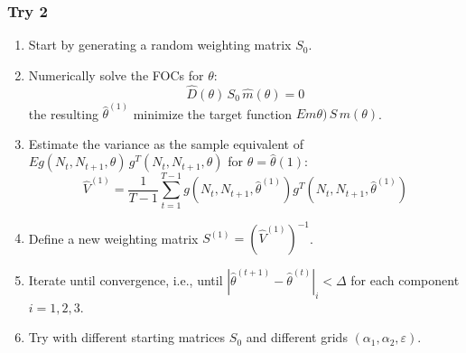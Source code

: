     \subsubsection{Try 2}
    \begin{enumerate}
        \item Start by generating a random weighting matrix $S_0$.
        \item Numerically solve the FOCs for $\theta$:
        \begin{equation}
            \hat D(\theta) \, S_0 \, \hat m (\theta) = 0
        \end{equation}
         the resulting $\hat \theta^{(1)}$ minimize the target function $E m\theta)  \, S \, m(\theta)$.
        \item Estimate the variance as the sample equivalent of $E g(N_t, N_{t+1}, \theta)  \, g^T(N_t, N_{t+1}, \theta)$ for $\theta = \hat \theta(1)$:
        \begin{equation}
            \hat V^{(1)}  = \frac{1}{T-1} \sum_{t=1}^{T-1} g(N_t, N_{t+1}, \hat \theta^{(1)}) g^T(N_t, N_{t+1}, \hat \theta^{(1)})
        \end{equation}
        \item Define a new weighting matrix $S^{(1)} = \left( \hat V^{(1)} \right)^{-1}$.
        \item Iterate until convergence, i.e., until $\left \vert \hat \theta^{(t+1)} - \hat \theta^{(t)} \right \vert_{i} < \Delta$ for each component $i=1,2,3$.
        \item Try with different starting matrices $S_0$ and different grids $(\alpha_1, \alpha_2, \varepsilon)$.
    \end{enumerate}
